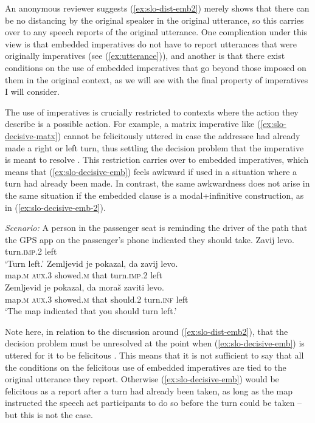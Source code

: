 \documentclass[output=paper,colorlinks,citecolor=brown]{langscibook}
\begin{document}
\noindent An anonymous reviewer suggests (\ref{ex:slo-dist-emb2}) merely shows that there can be no distancing by the original speaker in the original utterance, so this carries over to any speech reports of the original utterance. One complication under this view is that embedded imperatives do not have to report utterances that were originally imperatives (see (\ref{ex:utterance})), and another is that there exist conditions on the use of embedded imperatives that go beyond those imposed on them in the original context, as we will see with the final property of imperatives I will consider.   

The use of imperatives is crucially restricted to contexts where the action they describe is a possible action. For example, a matrix imperative like (\ref{ex:slo-decisive-matx}) cannot be felicitously uttered in case the addressee had already made a right or left turn, thus settling the decision problem that the imperative is meant to resolve \citep[][159--162]{kaufmannBOOK}. This restriction carries over to embedded imperatives, which means that (\ref{ex:slo-decisive-emb}) feels awkward if used in a situation where a turn had already been made. In contrast, the same awkwardness does not arise in the same situation if the embedded clause is a modal+infinitive construction, as in (\ref{ex:slo-decisive-emb-2}).%

\eanoraggedright\label{ex:slo-decisive} 
\textit{Scenario:} A person in the passenger seat is reminding the driver of the path that the GPS app on the passenger's phone indicated they should take.
\ea \label{ex:slo-decisive-matx}
\gll Zavij levo.\\
     turn.\textsc{imp.2} left\\
\glt `Turn left.'     
\ex \label{ex:slo-decisive-emb}
\gll Zemljevid je pokazal, da zavij levo.\\
     map.\textsc{m} \textsc{aux.3} showed.\textsc{m} that turn.\textsc{imp.2} left\\
\ex \label{ex:slo-decisive-emb-2}
\gll Zemljevid je pokazal, da mora\v{s} zaviti levo.\\
     map.\textsc{m} \textsc{aux.3} showed.\textsc{m} that should.\textsc{2} turn.\textsc{inf} left\\
\glt `The map indicated that you should turn left.'   \z\z  

\noindent Note here, in relation to the discussion around (\ref{ex:slo-dist-emb2}), that the decision problem must be unresolved at the point when (\ref{ex:slo-decisive-emb}) is uttered for it to be felicitous \citep[see also][647]{stegoveckaufmann}. This means that it is not sufficient to say that all the conditions on the felicitous use of embedded imperatives are tied to the original utterance they report. Otherwise (\ref{ex:slo-decisive-emb}) would be felicitous as a report after a turn had already been taken, as long as the map instructed the speech act participants to do so before the turn could be taken -- but this is not the case.
\end{document}
